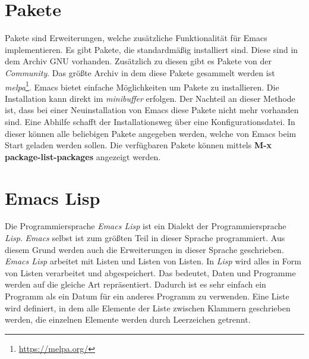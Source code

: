 \section{Pakete}
\label{sec:paketebasics}
Pakete sind Erweiterungen, welche zusätzliche Funktionalität für Emacs
implementieren. Es gibt Pakete, die standardmäßig installiert
sind. Diese sind in dem Archiv {\glqq}GNU{\grqq} vorhanden. Zusätzlich
zu diesen gibt es Pakete von der \textit{Community}. Das größte Archiv
in dem diese Pakete gesammelt werden ist
\textit{melpa}\footnote{\url{https://melpa.org/}}. Emacs bietet
einfache Möglichkeiten um Pakete zu installieren. Die Installation
kann direkt im \textit{minibuffer} erfolgen. Der Nachteil an dieser
Methode ist, dass bei einer Neuinstallation von Emacs diese Pakete
nicht mehr vorhanden sind. Eine Abhilfe schafft der Installationsweg
über eine Konfigurationsdatei. In dieser können alle beliebigen Pakete
angegeben werden, welche von Emacs beim Start geladen werden
sollen. Die verfügbaren Pakete können mittels \textbf{M-x
  package-list-packages} angezeigt werden. \\

\section{Emacs Lisp}
\label{sec:emacslisp}
Die Programmiersprache \textit{Emacs Lisp} ist ein Dialekt der
Programmiersprache \textit{Lisp}. \textit{Emacs} selbst ist zum
größten Teil in dieser Sprache programmiert. Aus diesem Grund werden
auch die Erweiterungen in dieser Sprache geschrieben. \textit{Emacs
  Lisp} arbeitet mit Listen und Listen von Listen. In \textit{Lisp}
wird alles in Form von Listen verarbeitet und abgespeichert. Das
bedeutet, Daten und Programme werden auf die gleiche Art
repräsentiert. Dadurch ist es sehr einfach ein Programm als ein Datum
für ein anderes Programm zu verwenden. Eine Liste wird definiert, in
dem alle Elemente der Liste zwischen Klammern geschrieben werden, die
einzelnen Elemente werden durch Leerzeichen getrennt. \cite{EmacsLisp}

